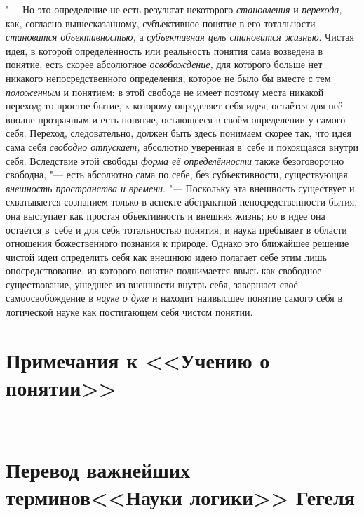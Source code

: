 "--- Но это определение не есть результат некоторого
{\em становления} и {\em перехода,} как,
согласно вышесказанному, субъективное понятие в его тотальности
{\em становится объективностью,} а {\em субъективная цель
становится жизнью}. Чистая идея, в которой определённость
или реальность понятия сама возведена в понятие, есть скорее абсолютное
{\em освобождение,} для
которого больше нет никакого непосредственного определения, которое не было
бы вместе с тем {\em положенным}
и понятием; в этой свободе не имеет поэтому места никакой
переход; то простое бытие, к которому определяет себя идея, остаётся для
неё вполне прозрачным и есть понятие, остающееся в своём определении у
самого себя. Переход, следовательно, должен быть здесь понимаем скорее так,
что идея сама себя {\em свободно
отпускает,} абсолютно уверенная в~себе и покоящаяся внутри
себя. Вследствие этой свободы {\em форма
её определённости} также безоговорочно свободна, "---
есть абсолютно сама по себе, без субъективности, существующая
{\em внешность пространства и времени}.
"--- Поскольку эта внешность существует и схватывается
сознанием только в аспекте абстрактной непосредственности
бытия, она выступает как простая объективность и внешняя жизнь; но в идее
она остаётся в~себе и для себя тотальностью понятия, и наука пребывает в
области отношения божественного познания к природе. Однако это ближайшее
решение чистой идеи определить себя как внешнюю идею полагает себе этим
лишь опосредствование, из которого понятие поднимается ввысь как свободное
существование, ушедшее из внешности внутрь себя, завершает своё
самоосвобождение в {\em науке о духе}
и находит наивысшее понятие самого себя в логической науке
как постигающем себя чистом понятии.

\clearpage

\chapter[Примечания к <<Учению о понятии>>]{Примечания к <<Учению о понятии>>}

\printpagenotes

\clearpage\
\chapter[Перевод важнейших терминов <<Науки логики>> Гегеля]
{Перевод важнейших терминов\newline<<Науки логики>> Гегеля}

